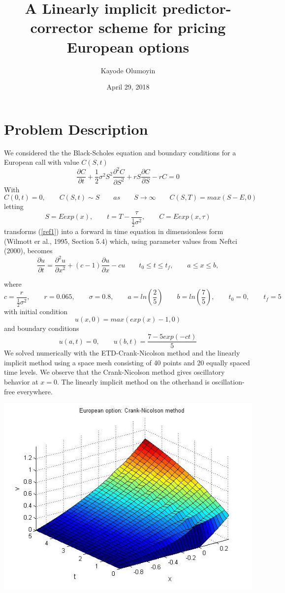 \documentclass[a4paper]{article}
\title{\bf A Linearly implicit predictor-corrector scheme for pricing European options}
\date{ April 29, 2018}
\author{Kayode Olumoyin}
\begin{document}
\maketitle

\section{Problem Description}
We considered the the Black-Scholes equation and boundary conditions for a European call with value $C(S,t)$
\begin{equation}\label{ref1}
\frac{\partial C}{\partial t} +  \frac{1}{2}\sigma^2 S^2 \frac{\partial ^2 C}{\partial S^2} + rS \frac{\partial C}{\partial S} -rC = 0
\end{equation}
With 
\[
C(0,t)=0, \qquad C(S,t) \sim S \qquad as  \qquad S \rightarrow \infty \qquad C(S,T)=max(S-E,0)
\]
letting
\[
S=E exp(x), \qquad t=T-\frac{\tau}{\frac{1}{2}\sigma^2}, \qquad C=E exp(x,\tau)
\]
transforms (\ref{ref1}) into a forward in time equation in dimensionless form (Wilmott er al., 1995, Section 5.4) which, using parameter values from Neftci (2000), becomes
\[
\frac{\partial u}{\partial t} = \frac{\partial ^2 u}{\partial x^2} + (c-1) \frac{\partial u}{\partial x} -cu  \qquad t_0 \leq t \leq t_f, \qquad a \leq x \leq b,
\]

where
\[
c=\frac{r}{\frac{1}{2}\sigma^2}, \qquad r=0.065, \qquad \sigma=0.8, \qquad a=ln(\frac{2}{5}) \qquad b=ln(\frac{7}{5}), \qquad t_0=0, \qquad t_f=5
\]
with initial condition
\[
u(x,0)=max(exp(x)-1,0)
\]
and boundary conditions
\[
u(a,t)=0, \qquad u(b,t)=\frac{7-5 exp(-ct)}{5}
\]
We solved numerically with the ETD-Crank-Nicolson method and the linearly implicit method using a space mesh consisting of 40 points and 20 equally spaced time levels. We observe that the Crank-Nicolson method gives oscillatory behavior at $x=0$. The linearly implicit method on the otherhand is oscillation-free everywhere.

\includegraphics[width=150mm,scale=1.0]{ETDcn.jpg}
\end{document}
